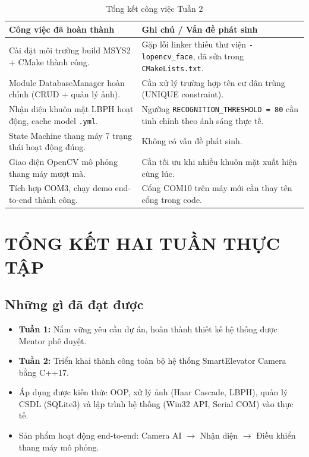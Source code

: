 \documentclass[12pt,a4paper]{article}
\begin{document}
\begin{table}[H]
    \centering
    \renewcommand{\arraystretch}{1.4}
    \begin{tabular}{|p{7cm}|p{7cm}|}
        \hline
        \rowcolor{lightblue}
        \textbf{Công việc đã hoàn thành} & \textbf{Ghi chú / Vấn đề phát sinh} \\
        \hline
        Cài đặt môi trường build MSYS2 + CMake thành công. & Gặp lỗi linker thiếu thư viện \texttt{-lopencv\_face}, đã sửa trong \texttt{CMakeLists.txt}. \\
        \hline
        Module DatabaseManager hoàn chỉnh (CRUD + quản lý ảnh). & Cần xử lý trường hợp tên cư dân trùng (UNIQUE constraint). \\
        \hline
        Nhận diện khuôn mặt LBPH hoạt động, cache model \texttt{.yml}. & Ngưỡng \texttt{RECOGNITION\_THRESHOLD = 80} cần tinh chỉnh theo ánh sáng thực tế. \\
        \hline
        State Machine thang máy 7 trạng thái hoạt động đúng. & Không có vấn đề phát sinh. \\
        \hline
        Giao diện OpenCV mô phỏng thang máy mượt mà. & Cần tối ưu khi nhiều khuôn mặt xuất hiện cùng lúc. \\
        \hline
        Tích hợp COM3, chạy demo end-to-end thành công. & Cổng COM10 trên máy mới cần thay tên cổng trong code. \\
        \hline
    \end{tabular}
    \caption{Tổng kết công việc Tuần 2}
\end{table}

\newpage

\section{TỔNG KẾT HAI TUẦN THỰC TẬP}

\subsection{Những gì đã đạt được}
\begin{itemize}[leftmargin=1.5cm]
    \item[$\checkmark$] \textbf{Tuần 1:} Nắm vững yêu cầu dự án, hoàn thành thiết kế hệ thống được Mentor phê duyệt.
    \item[$\checkmark$] \textbf{Tuần 2:} Triển khai thành công toàn bộ hệ thống SmartElevator Camera bằng C++17.
    \item[$\checkmark$] Áp dụng được kiến thức OOP, xử lý ảnh (Haar Cascade, LBPH), quản lý CSDL (SQLite3) và lập trình hệ thống (Win32 API, Serial COM) vào thực tế.
    \item[$\checkmark$] Sản phẩm hoạt động end-to-end: Camera AI $\rightarrow$ Nhận diện $\rightarrow$ Điều khiển thang máy mô phỏng.
\end{itemize}
\end{document}
